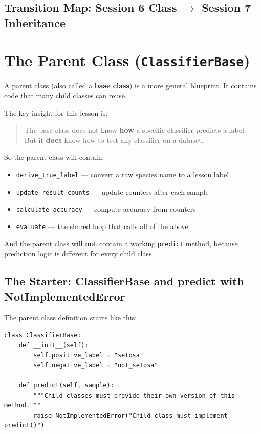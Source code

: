 \subsection{Transition Map: Session 6 Class $\rightarrow$ Session 7 Inheritance}



\section{The Parent Class (\texttt{ClassifierBase})}

A parent class (also called a \textbf{base class}) is a more general blueprint.
It contains code that many child classes can reuse.

\medskip
\noindent
The key insight for this lesson is:
\begin{quote}
The base class does not know \textbf{how} a specific classifier predicts a label.\\
But it \textbf{does} know how to test any classifier on a dataset.
\end{quote}

\noindent
So the parent class will contain:
\begin{itemize}
    \item \texttt{derive\_true\_label} --- convert a raw species name to a lesson label
    \item \texttt{update\_result\_counts} --- update counters after each sample
    \item \texttt{calculate\_accuracy} --- compute accuracy from counters
    \item \texttt{evaluate} --- the shared loop that calls all of the above
\end{itemize}

\noindent
And the parent class will \textbf{not} contain a working \texttt{predict} method, because prediction logic is different for every child class.

\subsection{The Starter: ClassifierBase and predict with NotImplementedError}

The parent class definition starts like this:

\begin{verbatim}
class ClassifierBase:
    def __init__(self):
        self.positive_label = "setosa"
        self.negative_label = "not_setosa"

    def predict(self, sample):
        """Child classes must provide their own version of this method."""
        raise NotImplementedError("Child class must implement predict()")
\end{verbatim}

